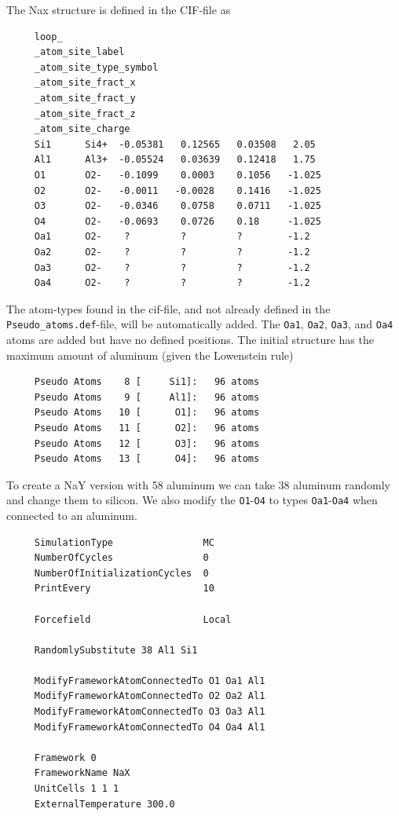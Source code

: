 The Nax structure is defined in the CIF-file as
\begin{tiny}
\begin{verbatim}
     loop_
     _atom_site_label
     _atom_site_type_symbol
     _atom_site_fract_x
     _atom_site_fract_y
     _atom_site_fract_z
     _atom_site_charge
     Si1      Si4+  -0.05381   0.12565   0.03508   2.05
     Al1      Al3+  -0.05524   0.03639   0.12418   1.75
     O1       O2-   -0.1099    0.0003    0.1056   -1.025
     O2       O2-   -0.0011   -0.0028    0.1416   -1.025
     O3       O2-   -0.0346    0.0758    0.0711   -1.025
     O4       O2-   -0.0693    0.0726    0.18     -1.025
     Oa1      O2-    ?         ?         ?        -1.2
     Oa2      O2-    ?         ?         ?        -1.2
     Oa3      O2-    ?         ?         ?        -1.2
     Oa4      O2-    ?         ?         ?        -1.2
\end{verbatim}
\end{tiny}
The atom-types found in the cif-file, and not already defined in the \verb+Pseudo_atoms.def+-file, will be automatically added.
The \verb+Oa1+, \verb+Oa2+, \verb+Oa3+, and \verb+Oa4+ atoms are added but have no defined positions.
The initial structure has the maximum amount of aluminum (given the Lowenstein rule)
\begin{tiny}
\begin{verbatim}
     Pseudo Atoms    8 [     Si1]:   96 atoms
     Pseudo Atoms    9 [     Al1]:   96 atoms
     Pseudo Atoms   10 [      O1]:   96 atoms
     Pseudo Atoms   11 [      O2]:   96 atoms
     Pseudo Atoms   12 [      O3]:   96 atoms
     Pseudo Atoms   13 [      O4]:   96 atoms
\end{verbatim}
\end{tiny}
To create a NaY version with 58 aluminum we can take 38 aluminum randomly and change them to silicon.
We also modify the \verb+O1+-\verb+O4+ to types \verb+Oa1+-\verb+Oa4+ when connected to an aluminum.
\begin{tiny}
\begin{verbatim}
     SimulationType                MC
     NumberOfCycles                0
     NumberOfInitializationCycles  0
     PrintEvery                    10
     
     Forcefield                    Local
     
     RandomlySubstitute 38 Al1 Si1
     
     ModifyFrameworkAtomConnectedTo O1 Oa1 Al1
     ModifyFrameworkAtomConnectedTo O2 Oa2 Al1
     ModifyFrameworkAtomConnectedTo O3 Oa3 Al1
     ModifyFrameworkAtomConnectedTo O4 Oa4 Al1
     
     Framework 0
     FrameworkName NaX
     UnitCells 1 1 1
     ExternalTemperature 300.0
\end{verbatim}
\end{tiny}

